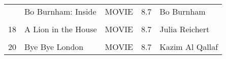 \begin{table}
{\begin{tabular}[t]{lllrl}
\addlinespace
16 & Bo Burnham: Inside & MOVIE & 8.7 & Bo Burnham\\
\cellcolor{gray!6}{17} & \cellcolor{gray!6}{Anbe Sivam} & \cellcolor{gray!6}{MOVIE} & \cellcolor{gray!6}{8.7} & \cellcolor{gray!6}{Sundar C}\\
18 & A Lion in the House & MOVIE & 8.7 & Julia Reichert\\
\cellcolor{gray!6}{19} & \cellcolor{gray!6}{A Lion in the House} & \cellcolor{gray!6}{MOVIE} & \cellcolor{gray!6}{8.7} & \cellcolor{gray!6}{Steven Bognar}\\
20 & Bye Bye London & MOVIE & 8.7 & Kazim Al Qallaf\\
\bottomrule
\end{tabular}}
\end{table}
